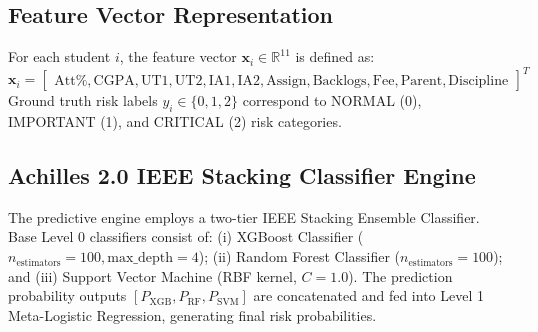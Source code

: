 \documentclass[conference]{IEEEtran}
\begin{document}
\subsection{Feature Vector Representation}
For each student $i$, the feature vector $\mathbf{x}_i \in \mathbb{R}^{11}$ is defined as:
\begin{equation}
\mathbf{x}_i = \begin{bmatrix} \text{Att}\%, \text{CGPA}, \text{UT1}, \text{UT2}, \text{IA1}, \text{IA2}, \text{Assign}, \text{Backlogs}, \text{Fee}, \text{Parent}, \text{Discipline} \end{bmatrix}^T
\end{equation}
Ground truth risk labels $y_i \in \{0, 1, 2\}$ correspond to NORMAL (0), IMPORTANT (1), and CRITICAL (2) risk categories.

\subsection{Achilles 2.0 IEEE Stacking Classifier Engine}
The predictive engine employs a two-tier IEEE Stacking Ensemble Classifier. Base Level 0 classifiers consist of: (i) XGBoost Classifier ($n_{\text{estimators}}=100, \text{max\_depth}=4$); (ii) Random Forest Classifier ($n_{\text{estimators}}=100$); and (iii) Support Vector Machine (RBF kernel, $C=1.0$). The prediction probability outputs $[P_{\text{XGB}}, P_{\text{RF}}, P_{\text{SVM}}]$ are concatenated and fed into Level 1 Meta-Logistic Regression, generating final risk probabilities.
\end{document}
